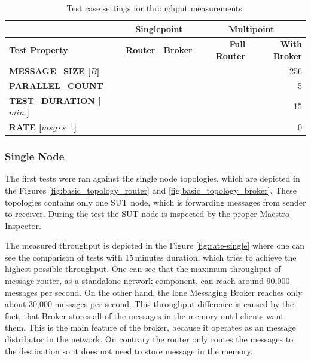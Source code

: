 \begingroup
\setlength{\tabcolsep}{10pt} %
\renewcommand{\arraystretch}{1.35} %
	\begin{table}[H]
	\centering
	\begin{tabular}{|l|r|r|r|r|}
	\hline

	\rowcolor[HTML]{C5E3DF}
	           & \multicolumn{2}{c|}{\textbf{Singlepoint}} & \multicolumn{2}{c|}{\textbf{Multipoint}} \\ \hline
	\rowcolor[HTML]{C5E3DF}
	\textbf{Test Property} & \textbf{Router}            & \textbf{Broker}                 & \textbf{Full Router}            & \textbf{With Broker}           \\ \hline
	\textbf{MESSAGE\_SIZE [$B$]}                        & \multicolumn{4}{r|}{256}                    \\ \hline
	\textbf{PARALLEL\_COUNT}                            & \multicolumn{4}{r|}{5}                      \\ \hline
	\textbf{TEST\_DURATION [$min.$]}                       & \multicolumn{4}{r|}{15}                    \\ \hline
	\textbf{RATE [$msg \cdot s^{-1}$]}                                       & \multicolumn{4}{r|}{0}                   		\\ \hline
	\end{tabular}
	\caption{Test case settings for throughput measurements.}
	\label{tab:test_case_throughput}
	\end{table}
\endgroup


\subsubsection*{Single Node}
The first tests were ran against the single node topologies, which are depicted in the Figures \ref{fig:basic_topology_router} and \ref{fig:basic_topology_broker}. These topologies contains only one SUT node, which is forwarding messages from sender to receiver. During the test the SUT node is inspected by the proper Maestro Inspector.

The measured throughput is depicted in the Figure \ref{fig:rate-single} where one can see the comparison of tests with 15\,minutes duration, which tries to achieve the highest possible throughput. One can see that the maximum throughput of message router, as a standalone network component, can reach around 90,000 messages per second. On the other hand, the lone Messaging Broker reaches only about 30,000 messages per second. This throughput difference is caused by the fact, that Broker stores all of the messages in the memory until clients want them. This is the main feature of the broker, because it operates as an message distributor in the network. On contrary the router only routes the messages to the destination so it does not need to store message in the memory.

